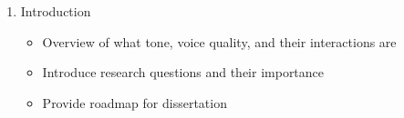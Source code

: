 \documentclass[12pt, letterpaper]{article}
\begin{document}
\begin{enumerate}
    \item Introduction
    \begin{itemize}
        \item Overview of what tone, voice quality, and their interactions are
        \item Introduce research questions and their importance
        \item Provide roadmap for dissertation
    \end{itemize}

\end{enumerate}
\end{document}

